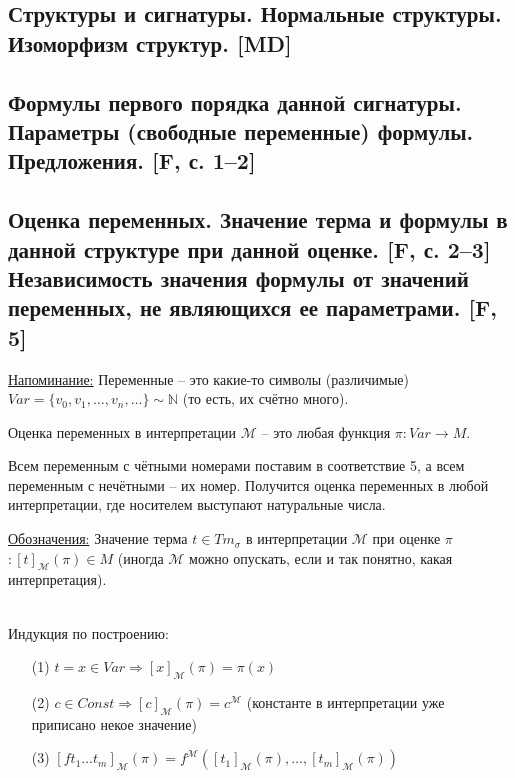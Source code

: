 \documentclass[a4paper, fleqn]{article}
\begin{document}
    \subsection{Структуры и сигнатуры. Нормальные структуры. Изоморфизм структур. [MD]}

    \subsection{Формулы первого порядка данной сигнатуры. Параметры (свободные переменные) формулы. Предложения. [F, с. 1–2]}

    \subsection{Оценка переменных. Значение терма и формулы в данной структуре при данной оценке. [F, с. 2–3] Независимость значения формулы от значений переменных, не являющихся ее параметрами. [F, 5]}
    \underline{Напоминание:} Переменные -- это какие-то символы (различимые) 
    $Var = \{v_0, v_1, \ldots, v_n, \ldots\} ∼ ℕ$ (то есть, их счётно много).
    \begin{definition}
        Оценка переменных в интерпретации $\mathcal{M}$ -- это любая функция
        $\pi: Var → M$.
    \end{definition}
    \begin{example}
        Всем переменным с чётными номерами поставим в соответствие 5, а
        всем переменным с нечётными -- их номер. 
        Получится оценка переменных в любой интерпретации, где носителем 
        выступают натуральные числа.  
    \end{example}
    \underline{Обозначения:} Значение терма $t ∈ Tm_{\sigma}$ в интерпретации
    $\mathcal{M}$ при оценке $\pi$ $: [t]_{\mathcal{M}}(\pi) ∈ M$ 
    (иногда $\mathcal{M}$ можно опускать, если и так понятно, какая 
    интерпретация).
    \begin{definition} \ \\
        Индукция по построению:  
        \begin{itemize}
            \item[(1)] $ t = x ∈ Var ⇒ [x]_{\mathcal{M}}(\pi) = \pi(x)$
            \item[(2)] $c ∈ Const ⇒ [c]_{\mathcal{M}}(\pi) = c^{\mathcal{M}}$
            (константе в интерпретации уже приписано некое значение)
            \item[(3)] $[ft_1\ldots t_m]_{\mathcal{M}}(\pi) = 
            f^{\mathcal{M}}([t_1]_{\mathcal{M}}(\pi), \ldots, 
            [t_m]_{\mathcal{M}}(\pi))$  
        \end{itemize}
    \end{definition}
\end{document}
